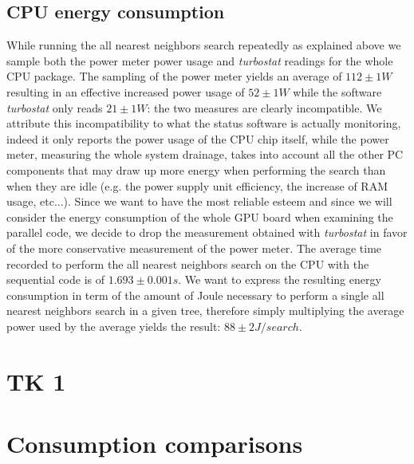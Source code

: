 \subsection{CPU energy consumption}
While running the all nearest neighbors search repeatedly as explained above we sample both the power meter power usage and \textit{turbostat} readings for the whole CPU package. The sampling of the power meter yields an average of $112 \pm 1 \unit{W}$ resulting in an effective increased power usage of $52 \pm 1 \unit{W}$ while the software \textit{turbostat} only reads $21 \pm 1 \unit{W}$: the two measures are clearly incompatible. We attribute this incompatibility to what the status software is actually monitoring, indeed it only reports the power usage of the CPU chip itself, while the power meter, measuring the whole system drainage, takes into account all the other PC components that may draw up more energy when performing the search than when they are idle (e.g. the power supply unit efficiency, the increase of RAM usage, etc...). Since we want to have the most reliable esteem and since we will consider the energy consumption of the whole GPU board when examining the parallel code, we decide to drop the measurement obtained with \textit{turbostat} in favor of the more conservative measurement of the power meter. The average time recorded to perform the all nearest neighbors search on the CPU with the sequential code is of $1.693 \pm 0.001 \unit{s}$. We want to express the resulting energy consumption in term of the amount of Joule necessary to perform a single all nearest neighbors search in a given tree, therefore simply multiplying the average power used by the average yields the result: $88 \pm 2 \unit{J/search}$.

\section{TK 1}

\section{Consumption comparisons}